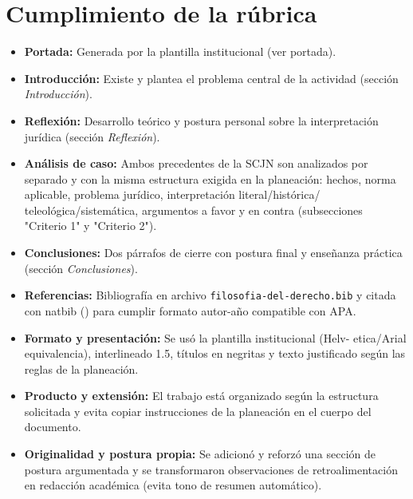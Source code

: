 \documentclass[
	spanish,
	letterpaper, oneside
]{article}
\begin{document}
%


\section*{Cumplimiento de la rúbrica}

\begin{itemize}
	\item \textbf{Portada:} Generada por la plantilla institucional (ver portada).
	\item \textbf{Introducción:} Existe y plantea el problema central de la actividad
	\quad (sección \textit{Introducción}).
	\item \textbf{Reflexión:} Desarrollo teórico y postura personal sobre la
	\quad interpretación jurídica (sección \textit{Reflexión}).
	\item \textbf{Análisis de caso:} Ambos precedentes de la SCJN son analizados por
	\quad separado y con la misma estructura exigida en la planeación: hechos,
	\quad norma aplicable, problema jurídico, interpretación literal/histórica/
	\quad teleológica/sistemática, argumentos a favor y en contra (subsecciones
	\quad "Criterio 1" y "Criterio 2").
	\item \textbf{Conclusiones:} Dos párrafos de cierre con postura final y
	\quad enseñanza práctica (sección \textit{Conclusiones}).
	\item \textbf{Referencias:} Bibliografía en archivo \texttt{filosofia-del-derecho.bib}
	\quad y citada con natbib (\texttt{}) para cumplir
	\quad formato autor-año compatible con APA.
	\item \textbf{Formato y presentación:} Se usó la plantilla institucional (Helv-\n
	\quad etica/Arial equivalencia), interlineado 1.5, títulos en negritas y
	\quad texto justificado según las reglas de la planeación.
	\item \textbf{Producto y extensión:} El trabajo está organizado según la
	\quad estructura solicitada y evita copiar instrucciones de la planeación en
	\quad el cuerpo del documento.
	\item \textbf{Originalidad y postura propia:} Se adicionó y reforzó una sección
	\quad de postura argumentada y se transformaron observaciones de retroalimentación
	\quad en redacción académica (evita tono de resumen automático).
\end{itemize}
\end{document}
